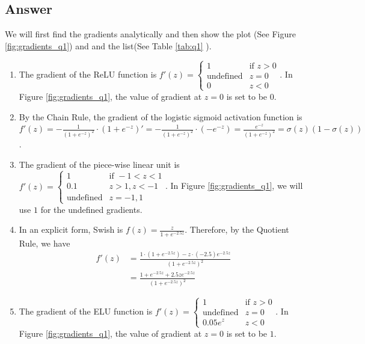 \documentclass[
	12pt, %
]{../Template/fphw}
\begin{document}

\subsection*{Answer}
We will first find the gradients analytically and then show the plot (See Figure \ref{fig:gradients_q1}) and and the list(See Table \ref{tab:q1} ).

\begin{enumerate}[label = (\arabic*)]
\item The gradient of the ReLU function is \( f'(z) = \begin{cases} 1 & \text{if } z > 0 \\ \text{undefined} & z=0\\ 0 & z<0 \end{cases}\). In Figure \ref{fig:gradients_q1}, the value of gradient at $z=0$ is set to be $0$.  
\item By the Chain Rule, the gradient of the logistic sigmoid activation function is $f'(z) = -\frac{1}{(1+e^{-z})^2}\cdot (1+e^{-z})' = -\frac{1}{(1+e^{-z})^2} \cdot (-e^{-z}) = \frac{e^{-z}}{(1+e^{-z})^2} = \sigma(z)(1-\sigma(z))$.
\item The gradient of the piece-wise linear unit is \( f'(z) = \begin{cases} 1 & \text{if } -1<z<1 \\ 0.1 & z>1, z<-1 \\ \text{undefined} & z=-1,1 \end{cases}\). In Figure \ref{fig:gradients_q1}, we will use $1$ for the undefined gradients.
\item In an explicit form, Swish is $f(z) =\frac{z}{1+e^{-2.5z}}$. Therefore, by the Quotient Rule, we have 
\begin{align*}f'(z) &= \frac{1\cdot (1+e^{-2.5z})-z\cdot (-2.5)e^{-2.5z}}{(1+e^{-2.5z})^2} \\ &= \frac{1+e^{-2.5z}+2.5ze^{-2.5z}}{(1+e^{-2.5z})^2}\end{align*}
\item The gradient of the ELU function is \( f'(z) = \begin{cases} 1 & \text{if } z > 0 \\ \text{undefined} & z=0\\ 0.05e^z & z<0 \end{cases}\). In Figure \ref{fig:gradients_q1}, the value of gradient at $z=0$ is set to be $1$. 

\end{enumerate}
\end{document}
